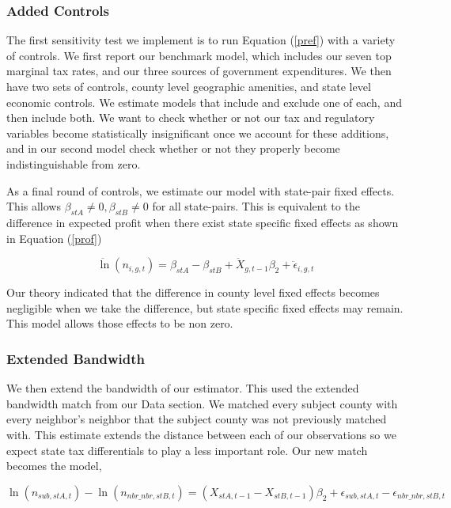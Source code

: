 \subsubsection{Added Controls}

The first sensitivity test we implement is to run Equation (\ref{pref}) with a variety of controls. We first report our benchmark model, which includes our seven top marginal tax rates, and our three sources of government expenditures. We then have two sets of controls, county level geographic amenities, and state level economic controls. We estimate models that include and exclude one of each, and then include both. We want to check whether or not our tax and regulatory variables become statistically insignificant once we account for these additions, and in our second model check whether or not they properly become indistinguishable from zero. 

As a final round of controls, we estimate our model with state-pair fixed effects. This allows $\beta_{stA} \neq 0, \beta_{stB} \neq 0$ for all state-pairs. This is equivalent to the difference in expected profit when there exist state specific fixed effects as shown in Equation (\ref{prof})

\begin{equation}\label{fe}
\ddot \ln(n_{i,g,t}) = \beta_{stA}-\beta_{stB}+\ddot X_{g,t-1}\beta_{2} + \ddot \epsilon_{i,g,t}
\end{equation}

Our theory indicated that the difference in county level fixed effects becomes negligible when we take the difference, but state specific fixed effects may remain. This model allows those effects to be non zero.

\subsubsection{Extended Bandwidth}

We then extend the bandwidth of our estimator. This used the extended bandwidth match from our Data section. We matched every subject county with every neighbor's neighbor that the subject county was not previously matched with. This estimate extends the distance between each of our observations so we expect state tax differentials to play a less important role. Our new match becomes the model,

\begin{equation}
\ln(n_{sub,stA,t})-\ln(n_{nbr\_nbr,stB,t}) = (X_{stA,t-1}-X_{stB,t-1})\beta_{2} + \epsilon_{sub,stA,t}-\epsilon_{nbr\_nbr,stB,t}
\end{equation}

